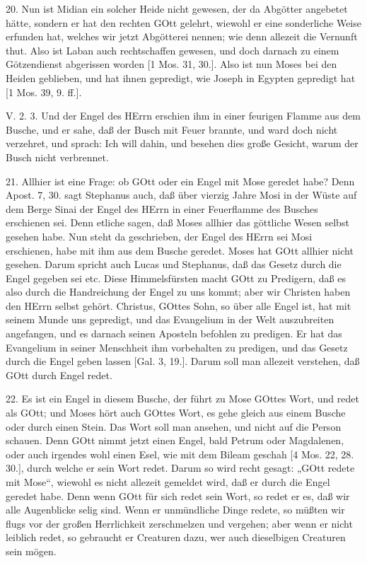 20. Nun ist Midian ein solcher Heide nicht gewesen, der da Abgötter angebetet hätte, sondern er hat den rechten GOtt gelehrt, wiewohl er eine sonderliche Weise erfunden hat, welches wir jetzt Abgötterei nennen; wie denn allezeit die Vernunft thut. Also ist Laban auch rechtschaffen gewesen, und doch darnach zu einem Götzendienst abgerissen worden [1 Mos. 31, 30.]. Also ist nun Moses bei den Heiden geblieben, und hat ihnen gepredigt, wie Joseph in Egypten gepredigt hat [1 Mos. 39, 9. ff.].

\begin{schriftzitat}
V. 2. 3. Und der Engel des HErrn erschien ihm in einer feurigen Flamme aus dem Busche, und er sahe, daß der Busch mit Feuer brannte, und ward doch nicht verzehret, und sprach: Ich will dahin, und besehen dies große Gesicht, warum der Busch nicht verbrennet.
\end{schriftzitat}

21. Allhier ist eine Frage: ob GOtt oder ein Engel mit Mose geredet habe? Denn Apost. 7, 30. sagt Stephanus auch, daß über vierzig Jahre Mosi in der Wüste auf dem Berge Sinai der Engel des HErrn in einer Feuerflamme des Busches erschienen sei. Denn etliche sagen, daß Moses allhier das göttliche Wesen selbst gesehen habe. Nun steht da geschrieben, der Engel des HErrn sei Mosi erschienen, habe mit ihm aus dem Busche geredet. Moses hat GOtt allhier nicht gesehen. Darum spricht auch Lucas und Stephanus, daß das Gesetz durch die Engel gegeben sei etc. Diese Himmelsfürsten macht GOtt zu Predigern, daß es also durch die Handreichung der Engel zu uns kommt; aber wir Christen haben den HErrn selbst gehört. Christus, GOttes Sohn, so über alle Engel ist, hat mit seinem Munde uns gepredigt, und das Evangelium in der Welt auszubreiten angefangen, und es darnach seinen Aposteln befohlen zu predigen. Er hat das Evangelium in seiner Menschheit ihm vorbehalten zu predigen, und das Gesetz durch
die Engel geben lassen [Gal. 3, 19.]. Darum soll man allezeit verstehen, daß GOtt durch Engel redet.

22. Es ist ein Engel in diesem Busche, der führt zu Mose GOttes Wort, und redet als GOtt; und Moses hört auch GOttes Wort, es gehe gleich aus einem Busche oder durch einen Stein. Das Wort soll man ansehen, und nicht auf die Person schauen. Denn GOtt nimmt jetzt einen Engel, bald Petrum oder Magdalenen, oder auch irgendes wohl einen Esel, wie mit dem Bileam geschah [4 Mos. 22, 28. 30.], durch welche er sein Wort redet. Darum so wird recht gesagt: „GOtt redete mit Mose“, wiewohl es nicht allezeit gemeldet wird, daß er durch die Engel geredet habe. Denn wenn GOtt für sich redet sein Wort, so redet er es, daß wir alle Augenblicke selig sind. Wenn er unmündliche Dinge redete, so müßten wir flugs vor der großen Herrlichkeit zerschmelzen und vergehen; aber wenn er nicht leiblich redet, so gebraucht er Creaturen dazu, wer auch dieselbigen Creaturen sein mögen.

